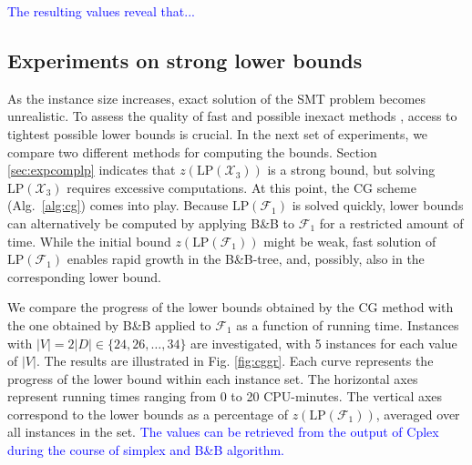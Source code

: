 \textcolor{blue}{
The resulting values reveal that...
}

\subsection{Experiments on strong lower bounds}

As the instance size increases, exact solution of the SMT problem becomes unrealistic.
To assess the quality of fast and possible inexact methods \citep{ivanova16isco}, access to tightest possible lower bounds is crucial.
In the next set of experiments, we compare two different methods for computing the bounds.
Section \ref{sec:expcomplp} indicates that $z\left(\text{LP}(\mathcal{X}_3)\right)$ is a strong bound,
but solving $\text{LP}(\mathcal{X}_3)$ requires excessive computations.
At this point, the CG scheme (Alg.\ \ref{alg:cg}) comes into play.
Because $\text{LP}(\mathcal{F}_1)$ is solved quickly, lower bounds can alternatively be computed 
by applying B\&B to $\mathcal{F}_1$ for a restricted amount of time.
While the initial bound $z\left(\text{LP}(\mathcal{F}_1)\right)$ might be weak, fast solution of $\text{LP}(\mathcal{F}_1)$ enables rapid growth in the B\&B-tree,
and, possibly, also in the corresponding lower bound.

We compare the progress of the lower bounds obtained by the CG method with the one obtained by B\&B applied to $\mathcal{F}_1$ as a function of running time.
Instances with $|V|=2|D|\in\{24, 26,\ldots, 34\}$ are investigated, with 5 instances for each value of $|V|$.
The results are illustrated in Fig. \ref{fig:cggr}.
Each curve represents the progress of the lower bound within each instance set.
The horizontal axes represent running times ranging from 0 to 20 CPU-minutes.
The vertical axes correspond to the lower bounds as a percentage of $z\left(\text{LP}(\mathcal{F}_1)\right)$, averaged over all instances in the set.
\textcolor{blue}{The values can be retrieved from the output of Cplex during the course of simplex and B\&B algorithm.}

